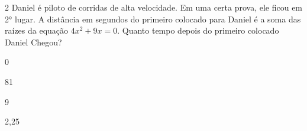 


















\num{2} Daniel é piloto de corridas de alta velocidade. Em uma certa prova,
ele ficou em 2° lugar. A distância em segundos do primeiro colocado para
Daniel é a soma das raízes da equação $4x^2 + 9x = 0$. Quanto tempo depois
do primeiro colocado Daniel Chegou?

\begin{escolha}[itemsep=0pt]
\item 0
\item 81
\item 9
\item 2,25
\end{escolha}



